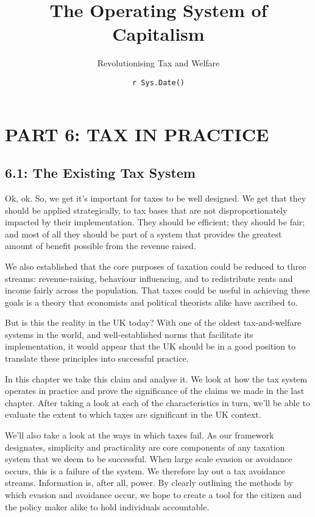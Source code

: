 \documentclass[]{article}
\title{The Operating System of Capitalism}
\subtitle{Revolutionising Tax and Welfare}
\author{}
\date{\texttt{r\ Sys.Date()}}
\begin{document}
\maketitle

\hypertarget{part-6-tax-in-practice}{%
\section{PART 6: TAX IN PRACTICE}\label{part-6-tax-in-practice}}

\hypertarget{the-existing-tax-system}{%
\subsection{6.1: The Existing Tax
System}\label{the-existing-tax-system}}

Ok, ok. So, we get it's important for taxes to be well designed. We get
that they should be applied strategically, to tax bases that are not
disproportionately impacted by their implementation. They should be
efficient; they should be fair; and most of all they should be part of a
system that provides the greatest amount of benefit possible from the
revenue raised.

We also established that the core purposes of taxation could be reduced
to three streams: revenue-raising, behaviour influencing, and to
redistribute rents and income fairly across the population. That taxes
could be useful in achieving these goals is a theory that economists and
political theorists alike have ascribed to.

But is this the reality in the UK today? With one of the oldest
tax-and-welfare systems in the world, and well-established norms that
facilitate its implementation, it would appear that the UK should be in
a good position to translate these principles into successful practice.

In this chapter we take this claim and analyse it. We look at how the
tax system operates in practice and prove the significance of the claims
we made in the last chapter. After taking a look at each of the
characteristics in turn, we'll be able to evaluate the extent to which
taxes are significant in the UK context.

We'll also take a look at the ways in which taxes fail. As our framework
designates, simplicity and practicality are core components of any
taxation system that we deem to be successful. When large scale evasion
or avoidance occurs, this is a failure of the system. We therefore lay
out a tax avoidance streams. Information is, after all, power. By
clearly outlining the methods by which evasion and avoidance occur, we
hope to create a tool for the citizen and the policy maker alike to hold
individuals accountable.
\end{document}
